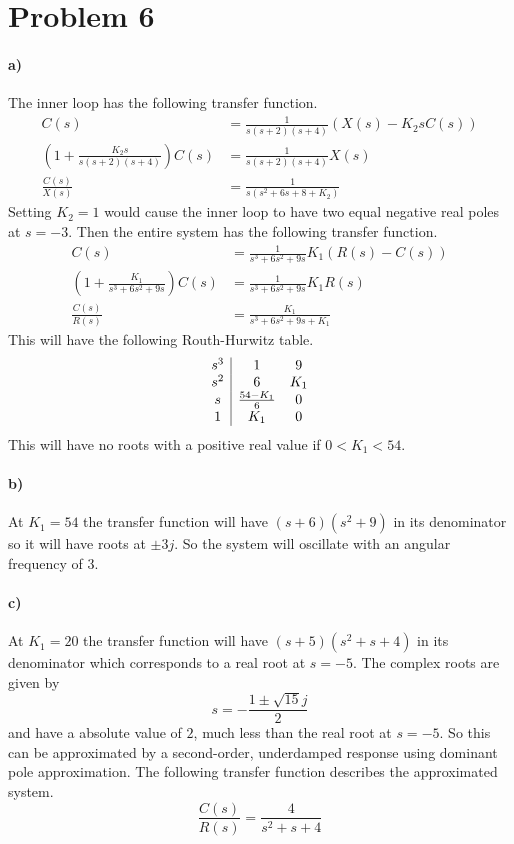 \documentclass[12pt]{article}
\begin{document}
\section*{Problem 6}

\paragraph{a)}

The inner loop has the following transfer function.
\begin{align*}
    C(s) &= \frac{1}{s(s+2)(s+4)}(X(s)-K_2sC(s))\\
    \left(1+\frac{K_2s}{s(s+2)(s+4)}\right)C(s)&=\frac{1}{s(s+2)(s+4)}X(s)\\
    \frac{C(s)}{X(s)}&=\frac{1}{s(s^2+6s+8+K_2)}
\end{align*}
Setting \(K_2=1\) would cause the inner loop to have two equal negative real poles at \(s=-3\). Then the
entire system has the following transfer function.
\begin{align*}
    C(s)&=\frac{1}{s^3+6s^2+9s}K_1(R(s)-C(s))\\
    \left(1+\frac{K_1}{s^3+6s^2+9s}\right)C(s)&=\frac{1}{s^3+6s^2+9s}K_1R(s)\\
    \frac{C(s)}{R(s)}&=\frac{K_1}{s^3+6s^2+9s+K_1}
\end{align*}
This will have the following Routh-Hurwitz table.
\[\begin{array}{c|c c}
    s^3 & 1 & 9\\
    s^2 & 6 & K_1\\
    s & \frac{54-K_1}{6} & 0\\
    1 & K_1 & 0
\end{array}\]
This will have no roots with a positive real value if \(0<K_1<54\).

\paragraph{b)}

At \(K_1=54\) the transfer function will have \((s+6)(s^2+9)\) in its denominator so it will have roots at \(\pm 3j\).
So the system will oscillate with an angular frequency of \(3\).

\paragraph{c)}

At \(K_1=20\) the transfer function will have \((s+5)(s^2+s+4)\) in its denominator which corresponds to a real root
at \(s=-5\). The complex roots are given by
\[s=-\frac{1\pm \sqrt{15}j}{2}\]
and have a absolute value of \(2\), much less than the real root at \(s=-5\). So this can be approximated by a second-order,
underdamped response using dominant pole approximation. The following transfer function describes the approximated system.
\[\frac{C(s)}{R(s)}=\frac{4}{s^2+s+4}\]
\end{document}

